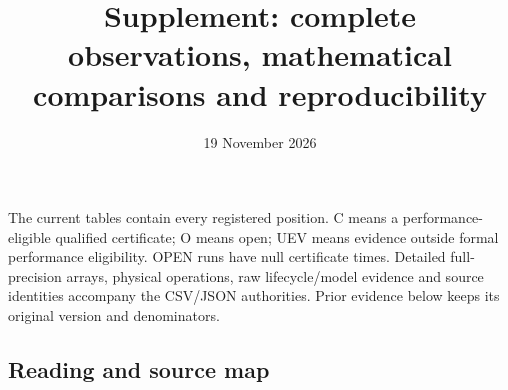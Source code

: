 \documentclass[
  american,
  11pt,
]{article}
\title{Supplement: complete observations, mathematical comparisons and
reproducibility}
\author{}
\date{19 November 2026}
\begin{document}
\maketitle

{
\setcounter{tocdepth}{2}
\tableofcontents
}
The current tables contain every registered position. C means a
performance-eligible qualified certificate; O means open; UEV means
evidence outside formal performance eligibility. OPEN runs have null
certificate times. Detailed full-precision arrays, physical operations,
raw lifecycle/model evidence and source identities accompany the
CSV/JSON authorities. Prior evidence below keeps its original version
and denominators.

\subsection{Reading and source map}\label{reading-and-source-map}
\end{document}
